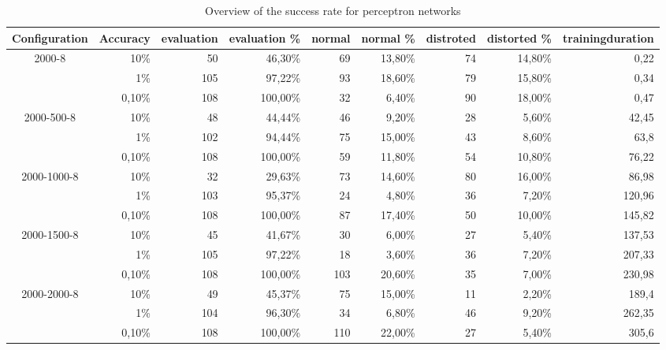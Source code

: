 \begin{sidewaystable}[htbp]
  \centering
  \caption{Overview of the success rate for perceptron networks}
    \begin{tabular}{rrrrrrrrr}
    \toprule
    Configuration & Accuracy & evaluation & evaluation \% & normal & normal \% & distroted & distorted \% & trainingduration \\
    \midrule
    \multicolumn{1}{c}{\multirow{3}[0]{*}{2000-8}} & 10\%  & 50    & 46,30\% & 69    & 13,80\% & 74    & 14,80\% & 0,22 \\
    \multicolumn{1}{c}{} & 1\%   & 105   & 97,22\% & 93    & 18,60\% & 79    & 15,80\% & 0,34 \\
    \multicolumn{1}{c}{} & 0,10\% & 108   & 100,00\% & 32    & 6,40\% & 90    & 18,00\% & 0,47 \\
    \multicolumn{1}{c}{\multirow{3}[0]{*}{2000-500-8}} & 10\%  & 48    & 44,44\% & 46    & 9,20\% & 28    & 5,60\% & 42,45 \\
    \multicolumn{1}{c}{} & 1\%   & 102   & 94,44\% & 75    & 15,00\% & 43    & 8,60\% & 63,8 \\
    \multicolumn{1}{c}{} & 0,10\% & 108   & 100,00\% & 59    & 11,80\% & 54    & 10,80\% & 76,22 \\
    \multicolumn{1}{c}{\multirow{3}[0]{*}{2000-1000-8}} & 10\%  & 32    & 29,63\% & 73    & 14,60\% & 80    & 16,00\% & 86,98 \\
    \multicolumn{1}{c}{} & 1\%   & 103   & 95,37\% & 24    & 4,80\% & 36    & 7,20\% & 120,96 \\
    \multicolumn{1}{c}{} & 0,10\% & 108   & 100,00\% & 87    & 17,40\% & 50    & 10,00\% & 145,82 \\
    \multicolumn{1}{c}{\multirow{3}[0]{*}{2000-1500-8}} & 10\%  & 45    & 41,67\% & 30    & 6,00\% & 27    & 5,40\% & 137,53 \\
    \multicolumn{1}{c}{} & 1\%   & 105   & 97,22\% & 18    & 3,60\% & 36    & 7,20\% & 207,33 \\
    \multicolumn{1}{c}{} & 0,10\% & 108   & 100,00\% & 103   & 20,60\% & 35    & 7,00\% & 230,98 \\
    \multicolumn{1}{c}{\multirow{3}[0]{*}{2000-2000-8}} & 10\%  & 49    & 45,37\% & 75    & 15,00\% & 11    & 2,20\% & 189,4 \\
    \multicolumn{1}{c}{} & 1\%   & 104   & 96,30\% & 34    & 6,80\% & 46    & 9,20\% & 262,35 \\
    \multicolumn{1}{c}{} & 0,10\% & 108   & 100,00\% & 110   & 22,00\% & 27    & 5,40\% & 305,6 \\

\end{tabular}
\end{sidewaystable}
